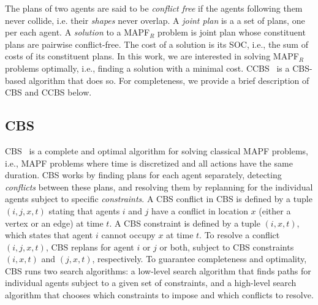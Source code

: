 \documentclass[letterpaper]{article} %
\newcommand\konstantin[1]{\nb{\textbf{Konstantin:}}{red}{#1}}
\newcommand{\cbs}{\ac{CBS}\xspace}
\newcommand{\ccbs}{\ac{CCBS}\xspace}
\newcommand{\soc}{\ac{SOC}\xspace}
\newcommand{\mapfr}{{MAPF}$_R$\xspace}
\newcommand{\mapf}{\ac{MAPF}\xspace}
\begin{document}
The plans of two agents are said to be \emph{conflict free} if the agents following them never collide, i.e. their \emph{shapes} never overlap. 
A \emph{joint plan} is a a set of plans, one per each agent. 
A \emph{solution} to a \mapfr problem is joint plan whose constituent plans are pairwise conflict-free. 
The cost of a solution is its \soc, i.e., the sum of costs of its constituent plans.  
In this work, we are interested in solving \mapfr problems optimally, i.e., finding a  solution with a minimal cost. %
\ccbs~\cite{andreychuk2019multi} is a \cbs-based algorithm that does so. 
For completeness, we provide a brief description of \cbs and \ccbs below. 





\subsection{\acf{CBS}}

\cbs~\cite{sharon2015conflict} is a complete and optimal algorithm for solving classical \mapf problems, i.e., \mapf problems where time is discretized and all actions have the same duration. 
\cbs works by finding plans for each agent separately, detecting \emph{conflicts} between these plans, and resolving them by replanning for the individual agents subject to specific \emph{constraints}.
A \cbs conflict in \cbs is defined by a tuple $(i,j,x,t)$ 
stating that agents $i$ and $j$ have a conflict in location $x$ (either a vertex or an edge) at time $t$. A \cbs constraint is defined by a tuple $(i,x,t)$, which states that agent $i$ cannot occupy $x$ at time $t$. 
To resolve a conflict $(i,j,x,t)$, \cbs replans for agent $i$ or $j$ or both, subject to \cbs constraints $(i,x,t)$ and $(j,x,t)$, respectively. 
To guarantee completeness and optimality, \cbs runs two search algorithms: a low-level search algorithm that finds paths for individual agents subject to a given set of constraints, and a high-level search algorithm that chooses which constraints to impose and which conflicts to resolve. 



\end{document}
